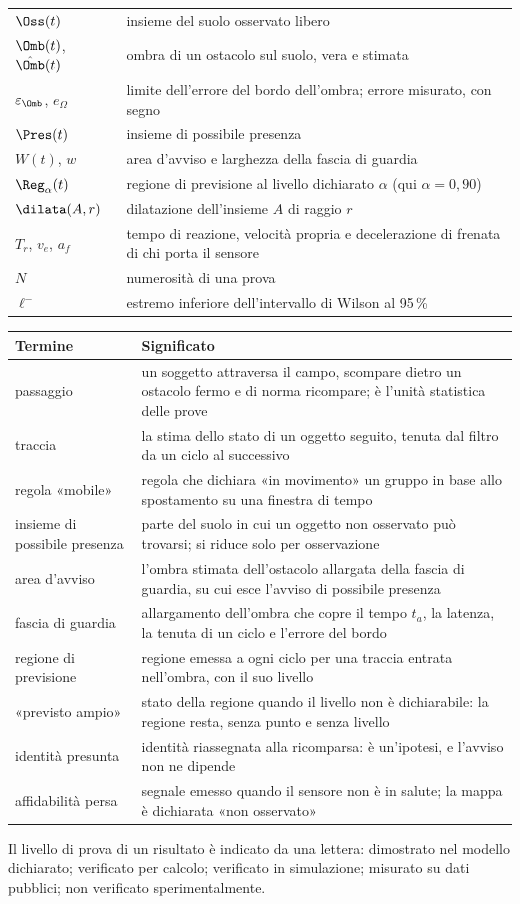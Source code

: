 {\begin{tabularx}{\textwidth}{@{}p{2.6cm}L@{}}
$\Oss(t)$ & insieme del suolo osservato libero\\
$\Omb(t)$, $\hat\Omb(t)$ & ombra di un ostacolo sul suolo, vera e stimata\\
$\varepsilon_\Omb$, $e_\Omega$ & limite dell'errore del bordo dell'ombra; errore misurato, con segno\\
$\Pres(t)$ & insieme di possibile presenza\\
$W(t)$, $w$ & area d'avviso e larghezza della fascia di guardia\\
$\Reg_\alpha(t)$ & regione di previsione al livello dichiarato $\alpha$ (qui $\alpha=0{,}90$)\\
$\dilata(A,r)$ & dilatazione dell'insieme $A$ di raggio $r$\\
$T_r$, $v_e$, $a_f$ & tempo di reazione, velocità propria e decelerazione di frenata di chi porta il sensore\\
$N$ & numerosità di una prova\\
$\ell^-$ & estremo inferiore dell'intervallo di Wilson al 95\,\%\\
\bottomrule
\end{tabularx}

\medskip
\begin{tabularx}{\textwidth}{@{}p{3.6cm}L@{}}
\toprule
Termine & Significato\\
\midrule
passaggio & un soggetto attraversa il campo, scompare dietro un ostacolo fermo e di norma ricompare; è l'unità statistica delle prove\\
traccia & la stima dello stato di un oggetto seguito, tenuta dal filtro da un ciclo al successivo\\
regola «mobile» & regola che dichiara «in movimento» un gruppo in base allo spostamento su una finestra di tempo\\
insieme di possibile presenza & parte del suolo in cui un oggetto non osservato può trovarsi; si riduce solo per osservazione\\
area d'avviso & l'ombra stimata dell'ostacolo allargata della fascia di guardia, su cui esce l'avviso di possibile presenza\\
fascia di guardia & allargamento dell'ombra che copre il tempo $t_a$, la latenza, la tenuta di un ciclo e l'errore del bordo\\
regione di previsione & regione emessa a ogni ciclo per una traccia entrata nell'ombra, con il suo livello\\
«previsto ampio» & stato della regione quando il livello non è dichiarabile: la regione resta, senza punto e senza livello\\
identità presunta & identità riassegnata alla ricomparsa: è un'ipotesi, e l'avviso non ne dipende\\
affidabilità persa & segnale emesso quando il sensore non è in salute; la mappa è dichiarata «non osservato»\\
\bottomrule
\end{tabularx}}

Il livello di prova di un risultato è indicato da una lettera:  dimostrato nel modello dichiarato;  verificato per calcolo;  verificato in simulazione;  misurato su dati pubblici;  non verificato sperimentalmente.
